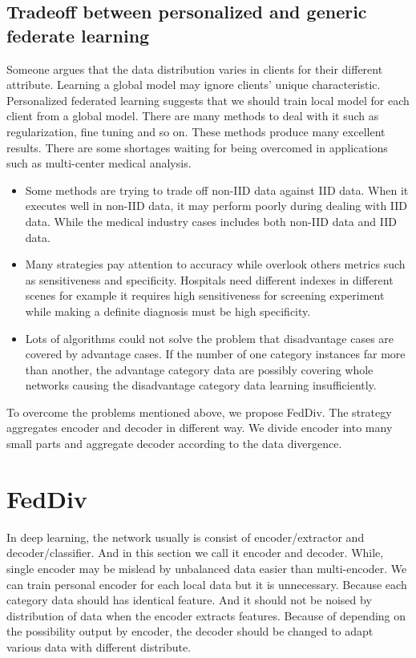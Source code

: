 \documentclass[journal]{IEEEtran}
\begin{document}
\subsection{Tradeoff between personalized and generic federate learning}
Someone argues that the data distribution varies in clients for their different attribute. Learning a global model may ignore clients' unique characteristic. Personalized federated learning suggests that we should train local model for each client from a global model. There are many methods to deal with it such as regularization, fine tuning and so on. These methods produce many excellent results. There are some shortages waiting for being overcomed in applications such as multi-center medical analysis.
\begin{itemize}
	\item Some methods are trying to trade off non-IID data against IID data. When it executes well in non-IID data, it may perform poorly during dealing with IID data. While the medical industry cases includes both non-IID data and IID data.
	\item Many strategies pay attention to accuracy while overlook others metrics such as sensitiveness and specificity. Hospitals need different indexes in different scenes for example it requires high sensitiveness for screening experiment while making a definite diagnosis must be high specificity.
	\item Lots of algorithms could not solve the problem that disadvantage cases are covered by advantage cases. If the number of one category instances far more than another, the advantage category data are possibly covering whole networks causing the disadvantage category data learning insufficiently.
\end{itemize}

To overcome the problems mentioned above, we propose FedDiv. The strategy aggregates encoder and decoder in different way. We divide encoder into many small parts and aggregate decoder according to the data divergence.

\section{FedDiv}
In deep learning, the network usually is consist of encoder/extractor and decoder/classifier. And in this section we call it encoder and decoder. While, single encoder may be mislead by unbalanced data easier than multi-encoder. We can train personal encoder for each local data but it is unnecessary. Because each category data should has identical feature. And it should not be noised by distribution of data when the encoder extracts features. Because of depending on the possibility output by encoder, the decoder should be changed to adapt various data with different distribute.
\end{document}
